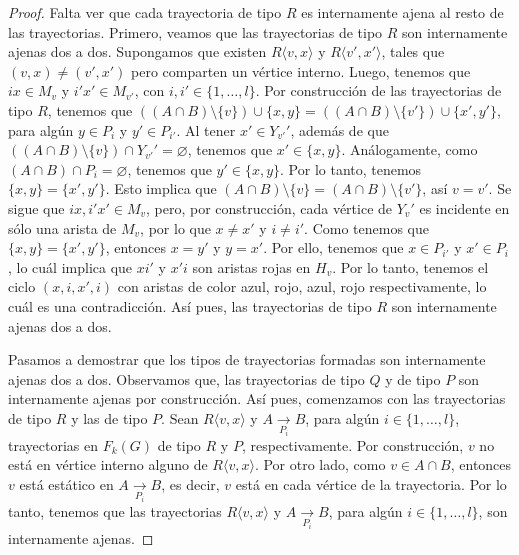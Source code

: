 \begin{proof}
    Falta ver que cada trayectoria de tipo $R$ es internamente ajena al resto de
    las trayectorias. Primero, veamos que las trayectorias de tipo $R$ son
    internamente ajenas dos a dos. Supongamos que existen $R \langle v, x
    \rangle$ y $R\langle v',x' \rangle$, tales que $(v,x) \neq (v',x')$ pero
    comparten un v\'ertice interno. Luego, tenemos que $ix \in M_v$ y $i'x'\in
    M_{v'}$, con $i, i' \in \{1, \dots, l\}$. Por construcci\'on de las
    trayectorias de tipo $R$, tenemos que $((A\cap B)\setminus \{v\}) \cup \{x,
    y\} =((A\cap B)\setminus \{v'\}) \cup \{x', y'\}$, para alg\'un $y \in P_i$
    y $y' \in P_{i'}$. Al tener $x'\in Y_{v'} '$, adem\'as de que $((A \cap B
    )\setminus \{v\}) \cap Y_{v'}'= \varnothing$, tenemos que $x' \in \{x,y\}$.
    An\'alogamente, como $(A \cap B) \cap P_i = \varnothing$, tenemos que $y'\in
    \{x, y\}$. Por lo tanto, tenemos $\{x,y\}= \{x',y'\}$. Esto implica que
    $(A\cap B)\setminus \{v\} = (A\cap B)\setminus \{v'\}$, as\'i $v = v'$.
    Se sigue que $ix, i'x' \in M_v$, pero, por construcci\'on, cada
    v\'ertice de $Y_v '$ es incidente en s\'olo una arista de $M_v$, por lo que
    $x \neq x'$ y $i \neq i'$. Como tenemos que $\{x, y\}=\{x', y'\}$, entonces
    $x=y'$ y $y=x'$. Por ello, tenemos que $x \in P_{i'}$ y $x'\in P_i$, lo
    cu\'al implica que $xi'$ y $x'i$ son aristas rojas en $H_v$. Por lo tanto,
    tenemos el ciclo $(x, i, x', i)$ con aristas de color azul, rojo, azul, rojo
    respectivamente, lo cu\'al es una contradicci\'on. As\'i pues, las
    trayectorias de tipo $R$ son internamente ajenas dos a dos.

    Pasamos a demostrar que los tipos de trayectorias formadas son internamente
    ajenas dos a dos. Observamos que, las trayectorias de tipo $Q$ y de tipo $P$
    son internamente ajenas por construcci\'on. As\'i pues, comenzamos con las
    trayectorias de tipo $R$ y las de tipo $P$. Sean $R\langle v,x \rangle$ y $A
    \xrightarrow[P_i]{}  B$, para alg\'un $i \in \{1, \dots, l\}$, trayectorias
    en $F_k(G)$ de tipo $R$ y $P$, respectivamente. Por construcci\'on, $v$ no
    est\'a en v\'ertice interno alguno de $R \langle v,x \rangle$. Por otro
    lado, como $ v \in A\cap B$, entonces $v$ est\'a est\'atico en $A
    \xrightarrow[P_i]{}  B$, es decir, $v$ est\'a en cada v\'ertice de la
    trayectoria. Por lo tanto, tenemos que las trayectorias $R\langle v,x
    \rangle$ y $A \xrightarrow[P_i]{}  B$, para alg\'un $i \in \{1, \dots, l\}$,
    son internamente ajenas.


\end{proof}
